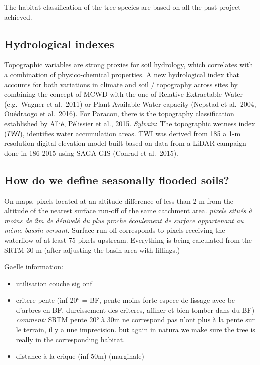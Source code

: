 \documentclass[
]{book}
\providecommand{\tightlist}{%
  \setlength{\itemsep}{0pt}\setlength{\parskip}{0pt}}
\begin{document}
The habitat classification of the tree species are based on all the past project achieved.

\hypertarget{hydrological-indexes}{%
\subsection{Hydrological indexes}\label{hydrological-indexes}}

Topographic variables are strong proxies for soil hydrology, which correlates with a combination of physico-chemical properties. A new hydrological index that accounts for both variations in climate and soil / topography across sites by combining the concept of MCWD with the one of Relative Extractable Water (e.g.~Wagner et al.~2011) or Plant Available Water capacity (Nepstad et al.~2004, Ouédraogo et al.~2016). For Paracou, there is the topography classification established by Allié, Pélissier et al., 2015. \emph{Sylvain}: The topographic wetness index (𝑇𝑊𝐼), identifies water accumulation areas. TWI was derived from 185 a 1-m resolution digital elevation model built based on data from a LiDAR campaign done in 186 2015 using SAGA-GIS (Conrad et al.~2015).

\hypertarget{how-do-we-define-seasonally-flooded-soils}{%
\subsection{How do we define seasonally flooded soils?}\label{how-do-we-define-seasonally-flooded-soils}}

On maps, pixels located at an altitude difference of less than 2 m from the altitude of the nearest surface run-off of the same catchment area. \emph{pixels situés à moins de 2m de dénivelé du plus proche écoulement de surface appartenant au même bassin versant}. Surface run-off corresponds to pixels receiving the waterflow of at least 75 pixels upstream. Everything is being calculated from the SRTM 30 m (after adjusting the basin area with fillings.)

Gaelle information:

\begin{itemize}
\tightlist
\item
  utilisation couche sig onf
\item
  critere pente (inf 20° = BF, pente moins forte espece de lissage avec bc d'arbres en BF, durcissement des criteres, affiner et bien tomber dans du BF) \emph{comment:} SRTM pente 20° à 30m ne correspond pas n'ont plus à la pente sur le terrain, il y a une imprecision. but again in natura we make sure the tree is really in the corresponding habitat.
\item
  distance à la crique (inf 50m) (marginale)
\end{itemize}
\end{document}
